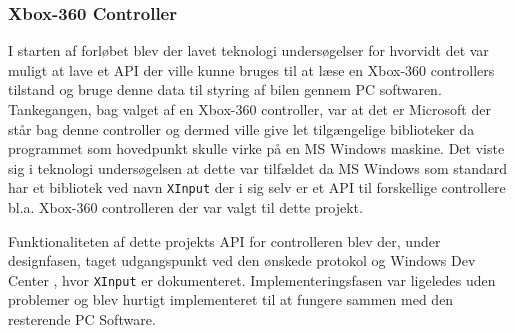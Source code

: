 \subsubsection{Xbox-360 Controller} \label{sec:controller}
I starten af forløbet blev der lavet teknologi undersøgelser for hvorvidt det var muligt at lave et API der ville kunne bruges til at læse en Xbox-360 controllers tilstand og bruge denne data til styring af bilen gennem PC softwaren. Tankegangen, bag valget af en Xbox-360 controller, var at det er Microsoft der står bag denne controller og dermed ville give let tilgængelige biblioteker da programmet som hovedpunkt skulle virke på en MS Windows maskine. Det viste sig i teknologi undersøgelsen at dette var tilfældet da MS Windows som standard har et bibliotek ved navn \texttt{XInput} der i sig selv er et API til forskellige controllere bl.a. Xbox-360 controlleren der var valgt til dette projekt.

Funktionaliteten af dette projekts API for controlleren blev der, under designfasen, taget udgangspunkt ved den ønskede protokol og Windows Dev Center \cite{lib:windows_xinput}, hvor \texttt{XInput} er dokumenteret. Implementeringsfasen var ligeledes uden problemer og blev hurtigt implementeret til at fungere sammen med den resterende PC Software.